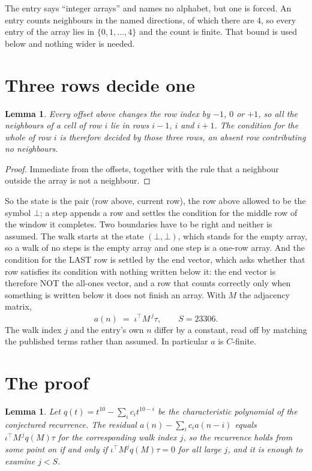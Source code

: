 \documentclass[11pt,a4paper]{article}
\theoremstyle{plain}
\newtheorem{lemma}[theorem]{Lemma}
\theoremstyle{definition}
\begin{document}
The entry says ``integer arrays'' and names no alphabet, but one is forced. An entry counts
neighbours in the named directions, of which there are $4$, so every entry of the array
lies in $\{0,1,\dots,4\}$ and the count is finite. That bound is used below and
nothing wider is needed.

\section{Three rows decide one}

\begin{lemma}\label{lem:win}
Every offset above changes the row index by $-1$, $0$ or $+1$, so all the neighbours of a cell
of row $i$ lie in rows $i-1$, $i$ and $i+1$. The condition for the whole of row $i$ is
therefore decided by those three rows, an absent row contributing no neighbours.
\end{lemma}

\begin{proof}
Immediate from the offsets, together with the rule that a neighbour outside the array is not a
neighbour.
\end{proof}

So the state is the pair (row above, current row), the row above allowed to be the symbol
$\bot$; a step appends a row and settles the condition for the middle row of the window it
completes. Two boundaries have to be right and neither is assumed. The walk starts at the state
$(\bot,\bot)$, which stands for the empty array, so a walk of no steps is the empty array and
one step is a one-row array. And the condition for the LAST row is settled by the end vector,
which asks whether that row satisfies its condition with nothing written below it: the end
vector is therefore NOT the all-ones vector, and a row that counts correctly only when
something is written below it does not finish an array. With $M$ the adjacency matrix,
\[
a(n)\;=\;\iota^{\!\top}M^{\,j}\tau ,\qquad S=23306.
\]
The walk index $j$ and the entry's own $n$ differ by a constant, read off by matching the
published terms rather than assumed. In particular $a$ is $C$-finite.

\section{The proof}

\begin{lemma}\label{lem:crit}
Let $q(t)=t^{10}-\sum_i c_it^{10-i}$ be the characteristic polynomial of the
conjectured recurrence. The residual $a(n)-\sum_ic_ia(n-i)$ equals
$\iota^{\!\top}M^{\,j}q(M)\tau$ for the corresponding walk index $j$, so the recurrence
holds from some point on if and only if $\iota^{\!\top}M^{j}q(M)\tau=0$ for all large $j$,
and it is enough to examine $j<S$.
\end{lemma}
\end{document}

